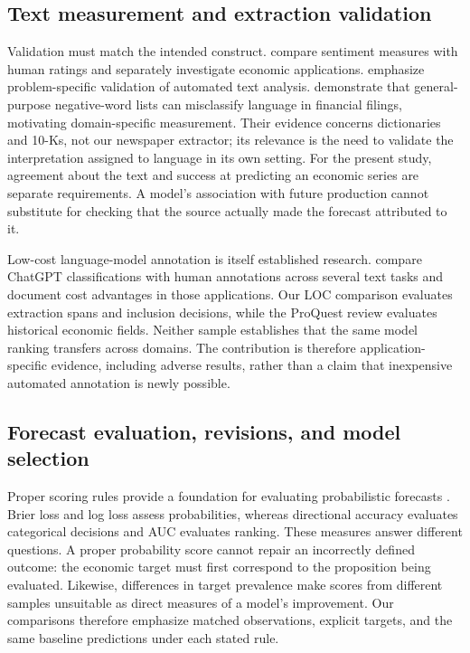 \subsection{Text measurement and extraction validation}
Validation must match the intended construct. \citet{shapiro2020} compare sentiment measures with human ratings and separately investigate economic applications. \citet{grimmer2013} emphasize problem-specific validation of automated text analysis. \citet{loughran2011} demonstrate that general-purpose negative-word lists can misclassify language in financial filings, motivating domain-specific measurement. Their evidence concerns dictionaries and 10-Ks, not our newspaper extractor; its relevance is the need to validate the interpretation assigned to language in its own setting. For the present study, agreement about the text and success at predicting an economic series are separate requirements. A model's association with future production cannot substitute for checking that the source actually made the forecast attributed to it.

Low-cost language-model annotation is itself established research. \citet{gilardi2023} compare ChatGPT classifications with human annotations across several text tasks and document cost advantages in those applications. Our LOC comparison evaluates extraction spans and inclusion decisions, while the ProQuest review evaluates historical economic fields. Neither sample establishes that the same model ranking transfers across domains. The contribution is therefore application-specific evidence, including adverse results, rather than a claim that inexpensive automated annotation is newly possible.

\subsection{Forecast evaluation, revisions, and model selection}
Proper scoring rules provide a foundation for evaluating probabilistic forecasts \citep{gneiting2007}. Brier loss and log loss assess probabilities, whereas directional accuracy evaluates categorical decisions and AUC evaluates ranking. These measures answer different questions. A proper probability score cannot repair an incorrectly defined outcome: the economic target must first correspond to the proposition being evaluated. Likewise, differences in target prevalence make scores from different samples unsuitable as direct measures of a model's improvement. Our comparisons therefore emphasize matched observations, explicit targets, and the same baseline predictions under each stated rule.

